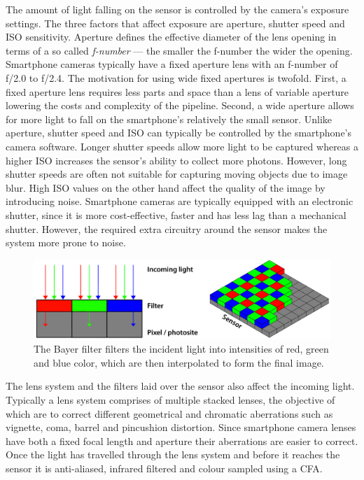 \documentclass[thesis.tex]{subfiles}
\begin{document}
The amount of light falling on the sensor is controlled by the camera's exposure settings. The three factors that affect exposure are aperture, shutter speed and ISO sensitivity. Aperture defines the effective diameter of the lens opening in terms of a so called \textit{f-number} --- the smaller the f-number the wider the opening. Smartphone cameras typically have a fixed aperture lens with an f-number of f/2.0 to f/2.4. The motivation for using wide fixed apertures is twofold. First, a fixed aperture lens requires less parts and space than a lens of variable aperture lowering the costs and complexity of the pipeline. Second, a wide aperture allows for more light to fall on the smartphone's relatively the small sensor. Unlike aperture, shutter speed and ISO can typically be controlled by the smartphone's camera software. Longer shutter speeds allow more light to be captured whereas a higher ISO increases the sensor's ability to collect more photons. However, long shutter speeds are often not suitable for capturing moving objects due to image blur. High ISO values on the other hand affect the quality of the image by introducing noise. Smartphone cameras are typically equipped with an electronic shutter, since it is more cost-effective, faster and has less lag than a mechanical shutter. However, the required extra circuitry around the sensor makes the system more prone to noise.

\begin{figure}[ht]
\centering \includegraphics[width=\textwidth]{images/bayer}
\caption{The Bayer filter filters the incident light into intensities of red, green and blue color, which are then interpolated to form the final image. \label{figure:bayer}}
\end{figure}

The lens system and the filters laid over the sensor also affect the incoming light. Typically a lens system comprises of multiple stacked lenses, the objective of which are to correct different geometrical and chromatic aberrations such as vignette, coma, barrel and pincushion distortion. Since smartphone camera lenses have both a fixed focal length and aperture their aberrations are easier to correct. Once the light has travelled through the lens system and before it reaches the sensor it is anti-aliased, infrared filtered and colour sampled using a CFA. \cite{color_pipeline}
\end{document}
